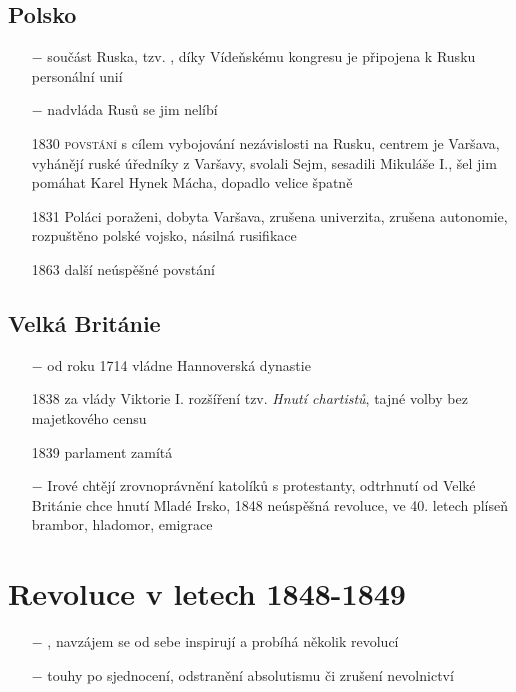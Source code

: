 \documentclass{article}
\begin{document}
\subsection*{Polsko}
\begin{itemize}
    \vspace{-0.5em}
    \setlength\itemsep{0.15em}
    \item[$-$] součást Ruska, tzv. , díky Vídeňskému kongresu je připojena k Rusku personální unií
    \item[$-$] nadvláda Rusů se jim nelíbí
    \item[1830] \textsc{povstání} s cílem vybojování nezávislosti na Rusku, centrem je Varšava, vyhánějí ruské úředníky z Varšavy, svolali Sejm, sesadili Mikuláše I., šel jim pomáhat Karel Hynek Mácha, dopadlo velice špatně
    \item[1831] Poláci poraženi, dobyta Varšava, zrušena univerzita, zrušena autonomie, rozpuštěno polské vojsko, násilná rusifikace
    \item[1863] další neúspěšné povstání
\end{itemize}


\subsection*{Velká Británie}
\begin{itemize}
    \vspace{-0.5em}
    \setlength\itemsep{0.15em}
    \item[$-$] od roku 1714 vládne Hannoverská dynastie
    \item[1838] za vlády Viktorie I. rozšíření tzv. \textit{Hnutí chartistů}, tajné volby bez majetkového censu
    \item[1839] parlament zamítá
    \item[$-$] Irové chtějí zrovnoprávnění katolíků s protestanty, odtrhnutí od Velké Británie chce hnutí Mladé Irsko, 1848 neúspěšná revoluce, ve 40. letech plíseň brambor, hladomor, emigrace
\end{itemize}

\section*{Revoluce v letech 1848-1849}


\begin{itemize}
    \vspace{-0.5em}
    \setlength\itemsep{0.15em}
    \item[$-$] , navzájem se od sebe inspirují a probíhá několik revolucí
    \item[$-$] touhy po sjednocení, odstranění absolutismu či zrušení nevolnictví
\end{itemize}
\end{document}
